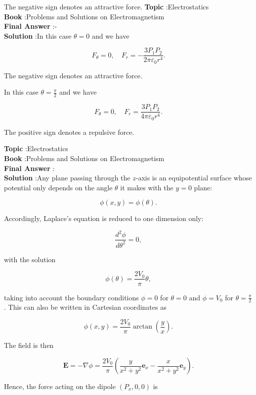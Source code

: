 \documentclass[10pt]{article}
\begin{document}
The negative sign denotes an attractive force.
\textbf{Topic} :Electrostatics\\
\textbf{Book} :Problems and Solutions on Electromagnetism\\
\textbf{Final Answer} :-\\


\textbf{Solution} :In this case $\theta=0$ and we have

$$
F_{\theta}=0, \quad F_{r}=-\frac{3 P_{1} P_{2}}{2 \pi \varepsilon_{0} r^{4}} .
$$

The negative sign denotes an attractive force.

 In this case $\theta=\frac{\pi}{2}$ and we have

$$
F_{\theta}=0, \quad F_{r}=\frac{3 P_{1} P_{2}}{4 \pi \varepsilon_{0} r^{4}} .
$$

The positive sign denotes a repulsive force.


\textbf{Topic} :Electrostatics\\
\textbf{Book} :Problems and Solutions on Electromagnetism\\
\textbf{Final Answer} :\\


\textbf{Solution} :Any plane passing through the $z$-axis is an equipotential surface whose potential only depends on the angle $\theta$ it makes with the $y=0$ plane:

$$
\phi(x, y)=\phi(\theta) .
$$

Accordingly, Laplace's equation is reduced to one dimension only:

$$
\frac{d^{2} \phi}{d \theta^{2}}=0,
$$

with the solution

$$
\phi(\theta)=\frac{2 V_{0}}{\pi} \theta,
$$

taking into account the boundary conditions $\phi=0$ for $\theta=0$ and $\phi=V_{0}$ for $\theta=\frac{\pi}{2}$. This can also be written in Cartesian coordinates as

$$
\phi(x, y)=\frac{2 V_{0}}{\pi} \arctan \left(\frac{y}{x}\right) .
$$

 The field is then

$$
\mathbf{E}=-\nabla \phi=\frac{2 V_{0}}{\pi}\left(\frac{y}{x^{2}+y^{2}} \mathbf{e}_{x}-\frac{x}{x^{2}+y^{2}} \mathbf{e}_{y}\right) .
$$

Hence, the force acting on the dipole $\left(P_{x}, 0,0\right)$ is
\end{document}
